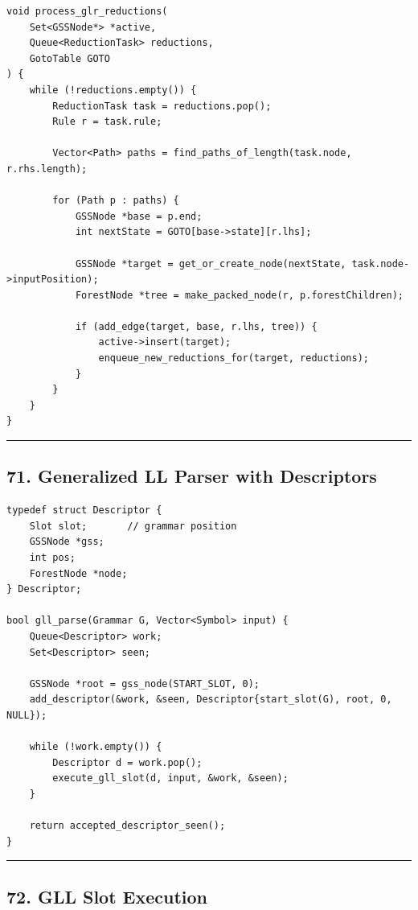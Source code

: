\documentclass[10pt,letterpaper]{article}
\begin{document}
\begin{verbatim}
void process_glr_reductions(
    Set<GSSNode*> *active,
    Queue<ReductionTask> reductions,
    GotoTable GOTO
) {
    while (!reductions.empty()) {
        ReductionTask task = reductions.pop();
        Rule r = task.rule;

        Vector<Path> paths = find_paths_of_length(task.node, r.rhs.length);

        for (Path p : paths) {
            GSSNode *base = p.end;
            int nextState = GOTO[base->state][r.lhs];

            GSSNode *target = get_or_create_node(nextState, task.node->inputPosition);
            ForestNode *tree = make_packed_node(r, p.forestChildren);

            if (add_edge(target, base, r.lhs, tree)) {
                active->insert(target);
                enqueue_new_reductions_for(target, reductions);
            }
        }
    }
}
\end{verbatim}

\medskip\hrule\medskip

\subsection*{71. Generalized LL Parser with Descriptors}

\begin{verbatim}
typedef struct Descriptor {
    Slot slot;       // grammar position
    GSSNode *gss;
    int pos;
    ForestNode *node;
} Descriptor;

bool gll_parse(Grammar G, Vector<Symbol> input) {
    Queue<Descriptor> work;
    Set<Descriptor> seen;

    GSSNode *root = gss_node(START_SLOT, 0);
    add_descriptor(&work, &seen, Descriptor{start_slot(G), root, 0, NULL});

    while (!work.empty()) {
        Descriptor d = work.pop();
        execute_gll_slot(d, input, &work, &seen);
    }

    return accepted_descriptor_seen();
}
\end{verbatim}

\medskip\hrule\medskip

\subsection*{72. GLL Slot Execution}
\end{document}
